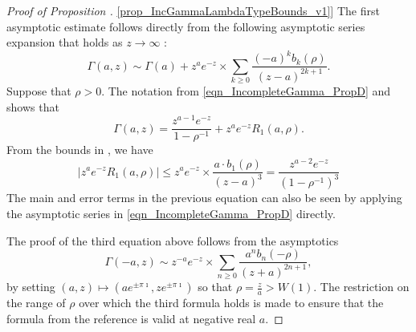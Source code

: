\documentclass[11pt,reqno,a4letter]{article}
\newcommand{\hlocalref}[1]{\hyperref[#1]{\ref{#1}}}
\numberwithin{equation}{section}
\numberwithin{figure}{section}
\numberwithin{table}{section}
\theoremstyle{plain}
\numberwithin{theorem}{section}
\theoremstyle{definition}
\theoremstyle{remark}
\begin{document}
\begin{proof}[Proof of Proposition \hlocalref{prop_IncGammaLambdaTypeBounds_v1}] 
The first asymptotic estimate follows directly from the following 
asymptotic series expansion that holds as $z \rightarrow \infty$ 
\cite[Eq.\ (2.1)]{NEMES2019}: 
\[
\Gamma(a, z) \sim \Gamma(a) + z^a e^{-z} \times \sum_{k \geq 0} 
     \frac{(-a)^k b_k(\rho)}{(z-a)^{2k+1}}. 
\]
Suppose that $\rho > 0$. 
The notation from \eqref{eqn_IncompleteGamma_PropD} and 
\cite[Thm.~1.1]{NEMES2016} shows that 
\[
\Gamma(a, z) = \frac{z^{a-1} e^{-z}}{1-\rho^{-1}} + z^{a} e^{-z} R_1(a, \rho). 
\]
From the bounds in \cite[\S 3.1]{NEMES2016}, we have 
\[
\left\lvert z^{a} e^{-z} R_1(a, \rho) \right\rvert \leq 
     z^a e^{-z} \times \frac{a \cdot b_1(\rho)}{(z-a)^{3}} = 
     \frac{z^{a-2} e^{-z}}{(1-\rho^{-1})^{3}}
\]
The main and error terms in the previous equation can also be 
seen by applying the asymptotic series in 
\eqref{eqn_IncompleteGamma_PropD} directly. 

The proof of the third equation above follows from the asymptotics 
\cite[Eq.\ (1.1)]{NEMES2015C}
\[
\Gamma(-a, z) \sim z^{-a} e^{-z} \times \sum_{n \geq 0} \frac{a^n b_n(-\rho)}{(z+a)^{2n+1}}, 
\]
by setting $(a, z) \mapsto \left(a e^{\pm \pi\imath}, z e^{\pm \pi\imath}\right)$ so that 
$\rho = \frac{z}{a} > W(1)$. 
The restriction on the range of $\rho$ over which the third formula holds is made to ensure that 
the formula from the reference is valid at negative real $a$. 
\end{proof}
\end{document}
